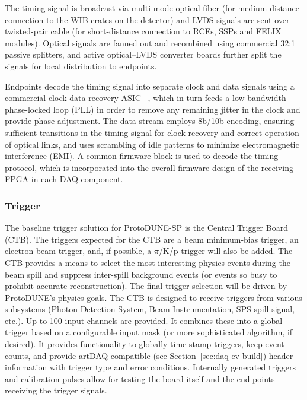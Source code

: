 The timing signal is broadcast via multi-mode optical fiber (for
medium-distance connection to the WIB crates on the detector) and LVDS
signals are sent over twisted-pair cable (for short-distance connection to RCEs,
SSPs and FELIX modules). Optical signals are fanned out and recombined
using commercial 32:1 passive splitters, and active optical--LVDS
converter boards further split the signals for local distribution to
endpoints. 

Endpoints decode the timing signal into separate clock and data
signals using a commercial clock-data recovery ASIC ~\cite{siliconlabs:Si5344}, which in turn
feeds a low-bandwidth phase-locked loop (PLL) in order to remove any remaining jitter in
the clock and provide phase adjustment. The data stream employs 8b/10b
encoding, ensuring sufficient transitions in the timing signal for clock
recovery and correct operation of optical links, and uses scrambling
of idle patterns to minimize electromagnetic interference (EMI).
 A common firmware block is used to
decode the timing protocol, which is incorporated into the overall
firmware design of the receiving FPGA in each DAQ component. 

\subsubsection{Trigger}

The baseline trigger solution for ProtoDUNE-SP is the Central Trigger Board
(CTB). The triggers expected for the CTB are a beam minimum-bias trigger,
an electron beam trigger, and, if possible, a $\pi$/K/p trigger will also be added.
The CTB provides a means to select the most interesting physics events
during the beam spill and suppress inter-spill background events (or
events so busy to prohibit accurate reconstruction).  The final trigger
selection will be driven by ProtoDUNE's physics goals.  The CTB is
designed to receive triggers from various subsystems (Photon Detection
System, Beam Instrumentation, SPS spill signal, etc.).
Up to 100 input channels are provided.  It combines these into a global
trigger based on a configurable input mask (or more sophisticated
algorithm, if desired).  It provides functionality to globally
time-stamp triggers, keep event counts, and provide artDAQ-compatible
(see Section~\ref{sec:daq-ev-build}) header information with trigger type
and error conditions.  Internally generated triggers and calibration
pulses allow for testing the board itself and the end-points receiving
the trigger signals.

